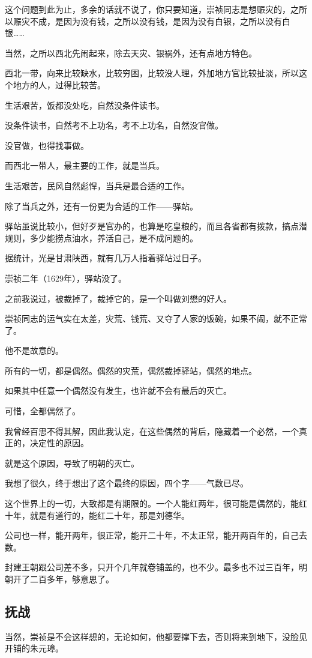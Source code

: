 \begin{multicols}{\theparacolNo}
这个问题到此为止，多余的话就不说了，你只要知道，崇祯同志是想赈灾的，之所以赈灾不成，是因为没有钱，之所以没有钱，是因为没有白银，之所以没有白银……

当然，之所以西北先闹起来，除去天灾、银祸外，还有点地方特色。

西北一带，向来比较缺水，比较穷困，比较没人理，外加地方官比较扯淡，所以这个地方的人，过得比较苦。

生活艰苦，饭都没处吃，自然没条件读书。

没条件读书，自然考不上功名，考不上功名，自然没官做。

没官做，也得找事做。

而西北一带人，最主要的工作，就是当兵。

生活艰苦，民风自然彪悍，当兵是最合适的工作。

除了当兵之外，还有一份更为合适的工作——驿站。

驿站虽说比较小，但好歹是官办的，也算是吃皇粮的，而且各省都有拨款，搞点潜规则，多少能捞点油水，养活自己，是不成问题的。

据统计，光是甘肃陕西，就有几万人指着驿站过日子。

崇祯二年（1629年），驿站没了。

之前我说过，被裁掉了，裁掉它的，是一个叫做刘懋的好人。

崇祯同志的运气实在太差，灾荒、钱荒、又夺了人家的饭碗，如果不闹，就不正常了。

他不是故意的。

所有的一切，都是偶然。偶然的灾荒，偶然裁掉驿站，偶然的地点。

如果其中任意一个偶然没有发生，也许就不会有最后的灭亡。

可惜，全都偶然了。

我曾经百思不得其解，因此我认定，在这些偶然的背后，隐藏着一个必然，一个真正的，决定性的原因。

就是这个原因，导致了明朝的灭亡。

我想了很久，终于想出了这个最终的原因，四个字——气数已尽。

这个世界上的一切，大致都是有期限的。一个人能红两年，很可能是偶然的，能红十年，就是有道行的，能红二十年，那是刘德华。

公司也一样，能开两年，很正常，能开二十年，不太正常，能开两百年的，自己去数。

封建王朝跟公司差不多，只开个几年就卷铺盖的，也不少。最多也不过三百年，明朝开了二百多年，够意思了。

\subsection{抚战}
当然，崇祯是不会这样想的，无论如何，他都要撑下去，否则将来到地下，没脸见开铺的朱元璋。


\end{multicols}
